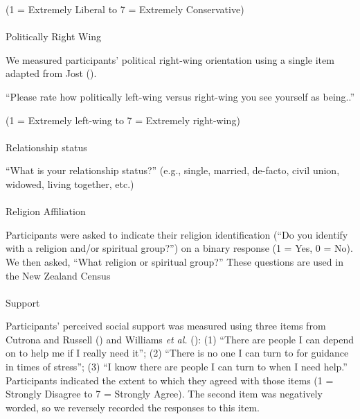 \documentclass[
  singlecolumn]{article}
\makeatletter
\let\oldparagraph\paragraph
\renewcommand{\paragraph}{
    \@ifstar
      \xxxParagraphStar
      \xxxParagraphNoStar
  }
\newcommand{\xxxParagraphStar}[1]{\oldparagraph*{#1}\mbox{}}
\newcommand{\xxxParagraphNoStar}[1]{\oldparagraph{#1}\mbox{}}
\makeatother
\begin{document}
(1 = Extremely Liberal to 7 = Extremely Conservative)

\paragraph{Politically Right Wing}\label{politically-right-wing}

We measured participants' political right-wing orientation using a
single item adapted from Jost ().

``Please rate how politically left-wing versus right-wing you see
yourself as being..''

(1 = Extremely left-wing to 7 = Extremely right-wing)

\paragraph{Relationship status}\label{relationship-status}

``What is your relationship status?'' (e.g., single, married, de-facto,
civil union, widowed, living together, etc.)

\paragraph{Religion Affiliation}\label{religion-affiliation}

Participants were asked to indicate their religion identification (``Do
you identify with a religion and/or spiritual group?'') on a binary
response (1 = Yes, 0 = No). We then asked, ``What religion or spiritual
group?'' These questions are used in the New Zealand Census

\paragraph{Support}\label{support}

Participants' perceived social support was measured using three items
from Cutrona and Russell () and Williams
\emph{et al.} (): (1)
``There are people I can depend on to help me if I really need it''; (2)
``There is no one I can turn to for guidance in times of stress''; (3)
``I know there are people I can turn to when I need help.'' Participants
indicated the extent to which they agreed with those items (1 = Strongly
Disagree to 7 = Strongly Agree). The second item was negatively worded,
so we reversely recorded the responses to this item.
\end{document}
